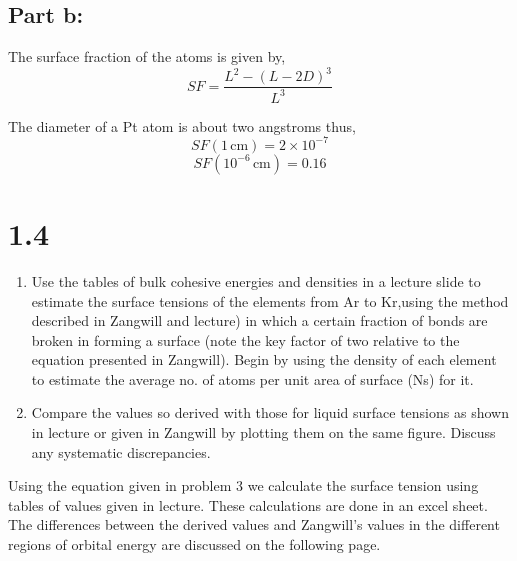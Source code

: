 \documentclass[12pt]{article}
\renewcommand{\=}[1]{\stackrel{#1}{=}} %
\theoremstyle{definition}
\theoremstyle{remark}
\begin{document}
\subsection*{Part b:}

The surface fraction of the atoms is given by,
\[
SF = \dfrac{L^2 - (L-2D)^3}{L^3} 
\]

The diameter of a Pt atom is about two angstroms thus,
\[
\boxed{SF(1\,\text{cm}) = 2\times 10^{-7}}
\]
\[
\boxed{SF(10^{-6}\,\text{cm}) = 0.16}
\]


\newpage
\section*{1.4}
\begin{bclogo}[logo=\bcquestion , barre=none]
\newline
\begin{enumerate}
\item Use the tables of bulk cohesive energies and densities in a lecture slide to estimate the surface tensions of the elements from Ar to Kr,using the method described in Zangwill and lecture) in which a certain fraction of bonds are broken in forming a surface (note the key factor of two relative to the equation presented in Zangwill). Begin by using the density of each element to estimate the average no. of atoms per unit area of surface (Ns) for it.

\item Compare the values so derived with those for liquid surface tensions as shown in lecture or given in Zangwill by plotting them on the same figure. Discuss any systematic discrepancies.
\end{enumerate}

\end{bclogo}
\vspace{2cm}

Using the equation given in problem 3 we calculate the surface tension using tables of values given in lecture. These calculations are done in an excel sheet. The differences between the derived values and Zangwill's values in the different regions of orbital energy are discussed on the following page.
\end{document}
